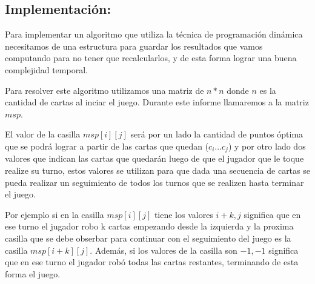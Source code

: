 \subsection{Implementación:}

Para implementar un algoritmo que utiliza la técnica de programación dinámica necesitamos de una estructura para guardar los resultados que vamos computando para no tener que recalcularlos, y de esta forma lograr una buena complejidad temporal.

Para resolver este algoritmo utilizamos una matriz de $n * n$ donde $n$ es la cantidad de cartas al inciar el juego. Durante este informe llamaremos a la matriz $msp$.

El valor de la casilla $msp[i][j]$ será por un lado la cantidad de puntos óptima que se podrá lograr a partir de las cartas que quedan ($c_i ... c_j$) y por otro lado dos valores que indican las cartas que quedarán luego de que el jugador que le toque realize su turno, estos valores se utilizan para que dada una secuencia de cartas se pueda realizar un seguimiento de todos los turnos que se realizen hasta terminar el juego.

Por ejemplo si en la casilla $msp[i][j]$ tiene los valores $i+k, j$ significa que en ese turno el jugador robo k cartas empezando desde la izquierda y la proxima casilla que se debe obserbar para continuar con el seguimiento del juego es la casilla $msp[i+k][j]$. Además, si los valores de la casilla son $-1, -1$ significa que en ese turno el jugador robó todas las cartas restantes, terminando de esta forma el juego.

